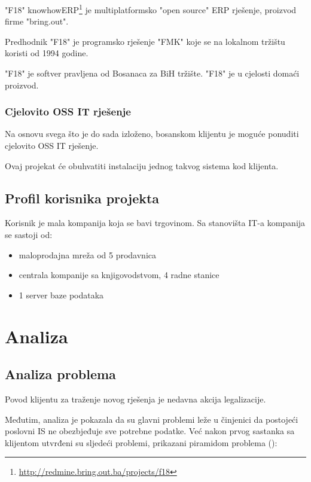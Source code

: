 \documentclass[times, utf8, seminar]{fit}
\begin{document}
"F18" knowhowERP\footnote{\url{http://redmine.bring.out.ba/projects/f18}} je multiplatformsko "open source" ERP rješenje, proizvod firme "bring.out".  

Predhodnik "F18" je programsko rješenje "FMK" koje se na lokalnom tržištu koristi od 1994 godine.

"F18" je softver pravljena od Bosanaca za BiH tržište. "F18" je u cjelosti domaći proizvod.

\subsection{Cjelovito OSS IT rješenje}
Na osnovu svega što je do sada izloženo, bosanskom klijentu je moguće ponuditi cjelovito OSS IT rješenje.  

Ovaj projekat će obuhvatiti instalaciju jednog takvog sistema kod klijenta.

\section{Profil korisnika projekta}
Korisnik je mala kompanija koja se bavi trgovinom. Sa stanovišta IT-a kompanija se sastoji od:
\begin{itemize}
  \item maloprodajna mreža od 5 prodavnica
  \item centrala kompanije sa knjigovodstvom, 4 radne stanice
  \item 1 server baze podataka 
\end{itemize}

\chapter{Analiza}

\section{Analiza problema}

Povod klijentu za traženje novog rješenja je nedavna akcija legalizacije. 

Međutim, analiza je pokazala da su glavni problemi leže u činjenici da postojeći poslovni IS ne obezbjeđuje sve potrebne podatke. Već nakon prvog sastanka sa klijentom utvrđeni su sljedeći problemi, prikazani piramidom problema (\cite{prasopro}):
\end{document}
